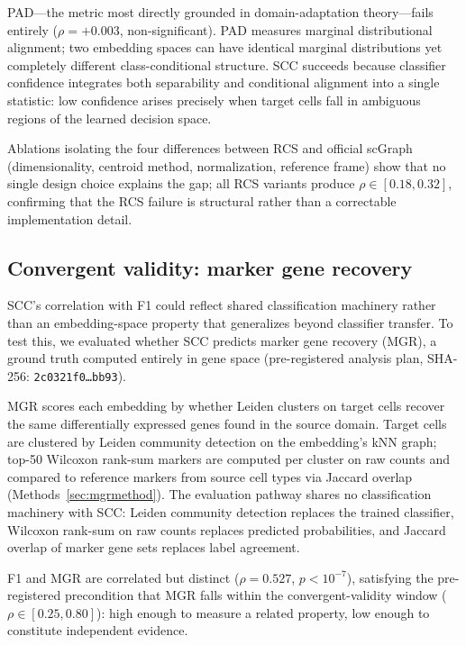 \documentclass[11pt]{article}
\begin{document}
PAD---the metric most directly grounded in domain-adaptation
theory---fails entirely ($\rho = +0.003$, non-significant). PAD
measures marginal distributional alignment; two embedding spaces can have
identical marginal distributions yet completely different class-conditional
structure. SCC succeeds because classifier confidence integrates both
separability and conditional alignment into a single statistic: low
confidence arises precisely when target cells fall in ambiguous regions
of the learned decision space.

Ablations isolating the four differences between RCS and official scGraph
(dimensionality, centroid method, normalization, reference frame) show
that no single design choice explains the gap; all RCS variants
produce $\rho \in [0.18, 0.32]$, confirming that the RCS failure is
structural rather than a correctable implementation detail.


\subsection{Convergent validity: marker gene recovery}
\label{sec:mgr}

SCC's correlation with F1 could reflect shared classification
machinery rather than an embedding-space property that generalizes
beyond classifier transfer. To test this, we evaluated whether SCC
predicts marker gene recovery (MGR), a ground truth computed entirely
in gene space (pre-registered analysis plan, SHA-256:
\texttt{2c0321f0\ldots bb93}).

MGR scores each embedding by whether Leiden clusters on target cells
recover the same differentially expressed genes found in the source
domain. Target cells are clustered by Leiden community detection on
the embedding's kNN graph; top-50 Wilcoxon rank-sum markers are
computed per cluster on raw counts and compared to reference markers
from source cell types via Jaccard overlap
(Methods~\ref{sec:mgrmethod}). The evaluation pathway shares no
classification machinery with SCC: Leiden community detection replaces
the trained classifier, Wilcoxon rank-sum on raw counts replaces
predicted probabilities, and Jaccard overlap of marker gene sets
replaces label agreement.

F1 and MGR are correlated but distinct ($\rho = 0.527$,
$p < 10^{-7}$), satisfying the pre-registered precondition that MGR
falls within the convergent-validity window ($\rho \in [0.25, 0.80]$):
high enough to measure a related property, low enough to constitute
independent evidence.
\end{document}
